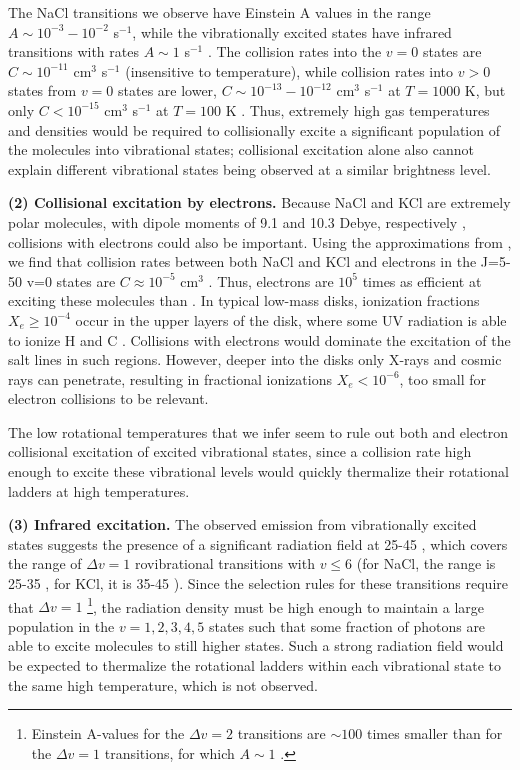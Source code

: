 \documentclass[twocolumn]{aastex62}
\begin{document}
The NaCl transitions we observe have  Einstein A values in the range
$A\sim10^{-3}-10^{-2}$ s$^{-1}$, while the vibrationally excited states have
infrared transitions with rates $A\sim1$ s$^{-1}$
\cite{Barton2014a,Cabezas2016a}.  The collision rates into the $v=0$ states are
$C\sim10^{-11}$ cm$^3$ s$^{-1}$ (insensitive to temperature), while collision
rates into $v>0$ states from $v=0$ states are lower, $C\sim10^{-13}-10^{-12}$
cm$^3$ s$^{-1}$ at $T=1000$ K, but only $C < 10^{-15}$  cm$^3$ s$^{-1}$ at
$T=100$ K \cite{Quintana-Lacaci2016a}.  Thus, extremely high gas temperatures
and densities would be required to collisionally excite a significant
population of the molecules into vibrational states; collisional excitation
alone also cannot explain different vibrational states being observed at a
similar brightness level.





\par{\textbf{(2) Collisional excitation by electrons.}} 
Because NaCl and KCl are extremely polar molecules, with dipole moments of 9.1
and 10.3 Debye, respectively \citep{Barton2014a}, collisions with electrons
could also be important.  Using the approximations from \citet{Dickinson1975a},
we find that collision rates between both NaCl and KCl and electrons in the
J=5-50 v=0 states are $C\approx10^{-5}$ cm$^{3}$ \pers.  Thus, electrons are
$10^5$ times as efficient at exciting these molecules than \hh. In typical
low-mass disks, ionization fractions $X_e \geq 10^{-4}$ occur in the upper
layers of the disk, where some UV radiation is able to ionize H and C
\citep{Bergin2007a}.  Collisions with electrons would dominate the excitation
of the salt lines in such regions.  However, deeper into the disks only X-rays
and cosmic rays can penetrate, resulting in fractional ionizations $X_e <
10^{-6}$, too small for electron collisions to be relevant. 

The low rotational temperatures that we infer seem to rule out both \hh and
electron collisional excitation of excited vibrational states, since a
collision rate high enough to excite these vibrational levels would quickly
thermalize their rotational ladders at high temperatures.


\par{\textbf{(3) Infrared excitation.}} 
The observed emission from vibrationally excited states suggests the
presence of a significant radiation field at 25-45 \um, which covers the range
of $\Delta v=1$ rovibrational transitions with $v\leq6$ (for NaCl, the range is
25-35 \um, for KCl, it is 35-45 \um).  Since the selection rules for these
transitions require that $\Delta v=1$ \footnote{Einstein A-values for the 
$\Delta v=2$ transitions are $\sim100$ times smaller than for the $\Delta v=1$
transitions, for which $A\sim1$ \pers.}, the radiation density must be high
enough to maintain a large population in the $v=1,
2, 3, 4, 5$ states such that some fraction of photons are able to excite
molecules to still higher states.  Such a strong radiation field would
be expected to thermalize the rotational ladders within each vibrational
state to the same high temperature, which is not observed.
\end{document}
